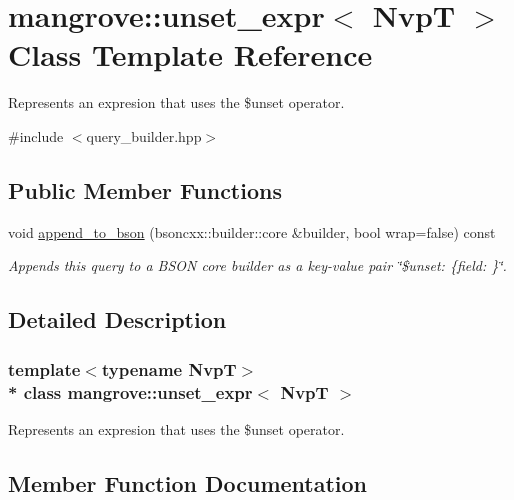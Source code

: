 \hypertarget{classmangrove_1_1unset__expr}{}\section{mangrove\+:\+:unset\+\_\+expr$<$ NvpT $>$ Class Template Reference}
\label{classmangrove_1_1unset__expr}


Represents an expresion that uses the \$unset operator.  




{\ttfamily \#include $<$query\+\_\+builder.\+hpp$>$}

\subsection*{Public Member Functions}
\begin{DoxyCompactItemize}
\item 
void \hyperlink{classmangrove_1_1unset__expr_ad304b725e0905bf7e32d5651a2bb9045}{append\+\_\+to\+\_\+bson} (bsoncxx\+::builder\+::core \&builder, bool wrap=false) const 
\begin{DoxyCompactList}\small\item\em Appends this query to a B\+S\+ON core builder as a key-\/value pair \char`\"{}\$unset\+: \{field\+: \textquotesingle{}\textquotesingle{}\}\char`\"{}. \end{DoxyCompactList}\end{DoxyCompactItemize}


\subsection{Detailed Description}
\subsubsection*{template$<$typename NvpT$>$\\*
class mangrove\+::unset\+\_\+expr$<$ Nvp\+T $>$}

Represents an expresion that uses the \$unset operator. 

\subsection{Member Function Documentation}
